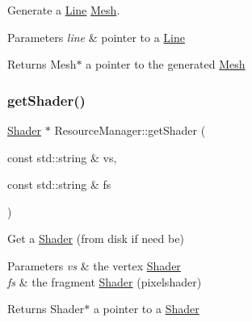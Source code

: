 Generate a \hyperlink{class_line}{Line} \hyperlink{class_mesh}{Mesh}. 


\begin{DoxyParams}{Parameters}
{\em line} & pointer to a \hyperlink{class_line}{Line} \\
\hline
\end{DoxyParams}
\begin{DoxyReturn}{Returns}
Mesh$\ast$ a pointer to the generated \hyperlink{class_mesh}{Mesh} 
\end{DoxyReturn}
\mbox{\label{class_resource_manager_ad4fba1143552a85ea52f864a1e445c25}} 
\subsubsection{\texorpdfstring{get\+Shader()}{getShader()}}
{\footnotesize\ttfamily \hyperlink{class_shader}{Shader} $\ast$ Resource\+Manager\+::get\+Shader (\begin{DoxyParamCaption}\item[{const std\+::string \&}]{vs,  }\item[{const std\+::string \&}]{fs }\end{DoxyParamCaption})}



Get a \hyperlink{class_shader}{Shader} (from disk if need be) 


\begin{DoxyParams}{Parameters}
{\em vs} & the vertex \hyperlink{class_shader}{Shader} \\
\hline
{\em fs} & the fragment \hyperlink{class_shader}{Shader} (\textquotesingle{}pixelshader\textquotesingle{}) \\
\hline
\end{DoxyParams}
\begin{DoxyReturn}{Returns}
Shader$\ast$ a pointer to a \hyperlink{class_shader}{Shader} 
\end{DoxyReturn}
\mbox{\label{class_resource_manager_a83af97058447e2119fc870a405421e32}} 
